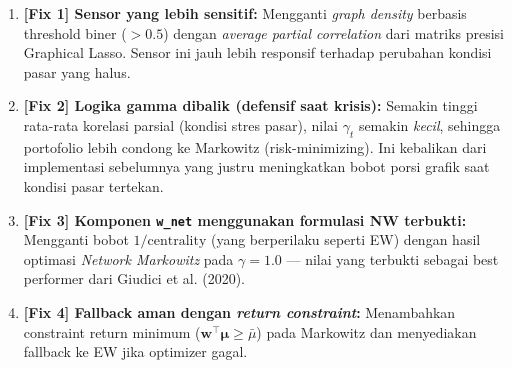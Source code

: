 \documentclass[12pt,a4paper]{article}
\begin{document}
\begin{enumerate}
    \item \textbf{[Fix 1] Sensor yang lebih sensitif:} Mengganti \textit{graph density} berbasis threshold biner ($>0.5$) dengan \textit{average partial correlation} dari matriks presisi Graphical Lasso. Sensor ini jauh lebih responsif terhadap perubahan kondisi pasar yang halus.
    \item \textbf{[Fix 2] Logika gamma dibalik (defensif saat krisis):} Semakin tinggi rata-rata korelasi parsial (kondisi stres pasar), nilai $\gamma_t$ semakin \textit{kecil}, sehingga portofolio lebih condong ke Markowitz (risk-minimizing). Ini kebalikan dari implementasi sebelumnya yang justru meningkatkan bobot porsi grafik saat kondisi pasar tertekan.
    \item \textbf{[Fix 3] Komponen \texttt{w\_net} menggunakan formulasi NW terbukti:} Mengganti bobot $1/\text{centrality}$ (yang berperilaku seperti EW) dengan hasil optimasi \textit{Network Markowitz} pada $\gamma=1.0$ --- nilai yang terbukti sebagai best performer dari Giudici et al. (2020).
    \item \textbf{[Fix 4] Fallback aman dengan \textit{return constraint}:} Menambahkan constraint return minimum ($\mathbf{w}^\top\boldsymbol{\mu} \geq \bar{\mu}$) pada Markowitz dan menyediakan fallback ke EW jika optimizer gagal.
\end{enumerate}
\end{document}
